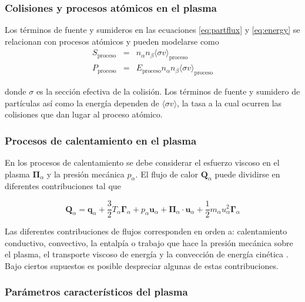 \subsubsection{Colisiones y procesos atómicos en el plasma}

Los términos de fuente y sumideros en las ecuaciones \eqref{eq:partflux} y \eqref{eq:energy} se relacionan con procesos atómicos y pueden modelarse como \cite{goldston1995}
\begin{eqnarray}
	S_\text{proceso} &=& n_\alpha n_\beta \langle \sigma v \rangle_\text{proceso}\\
	P_\text{proceso} &=& E_\text{proceso} n_\alpha n_\beta \langle \sigma v \rangle_\text{proceso} 
\end{eqnarray}

donde $\sigma$ es la sección efectiva de la colisión. Los términos de fuente y sumidero de partículas así como la energía dependen de $\langle \sigma v\rangle$, la tasa a la cual ocurren las colisiones que dan lugar al proceso atómico.  

\subsubsection{Procesos de calentamiento en el plasma}

En los procesos de calentamiento se debe considerar el esfuerzo viscoso en el plasma $\bm{\Pi}_\alpha$ y la presión mecánica $p_\alpha$. El flujo de calor $\bm{Q}_\alpha$ puede dividirse en diferentes contribuciones tal que

\begin{equation}\label{eq:heatflux}
    \textbf{Q}_\alpha = \textbf{q}_\alpha + \frac{3}{2}T_\alpha\pmb{\Gamma}_\alpha + p_\alpha\textbf{u}_\alpha + \pmb{\Pi}_\alpha\cdot\textbf{u}_\alpha + \frac{1}{2}m_\alpha u_\alpha^2\pmb{\Gamma}_\alpha
  \end{equation}
 
 Las diferentes contribuciones de flujos corresponden en orden a: calentamiento conductivo, convectivo, la entalpía o trabajo que hace la presión mecánica sobre el plasma, el transporte viscoso de energía y la convección de energía cinética \cite{helander2005}. Bajo ciertos supuestos es posible despreciar algunas de estas contribuciones. 
 
 \subsubsection{Parámetros característicos del plasma}
 
